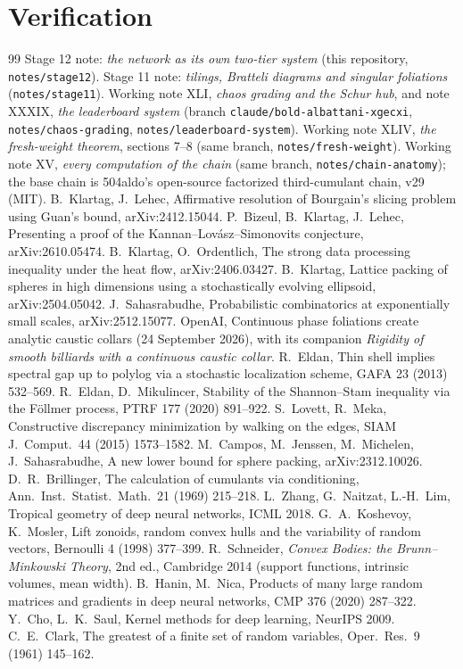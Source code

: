\documentclass[11pt]{article}
\theoremstyle{plain}
\theoremstyle{definition}\newtheorem{definition}[theorem]{Definition}\newtheorem{remark}[theorem]{Remark}
\begin{document}
\section*{Verification}

\begin{thebibliography}{99}\small
{} Stage 12 note: \emph{the network as its own two-tier system} (this repository, \texttt{notes/stage12}).
 Stage 11 note: \emph{tilings, Bratteli diagrams and singular foliations} (\texttt{notes/stage11}).
 Working note XLI, \emph{chaos grading and the Schur hub}, and note XXXIX, \emph{the leaderboard system} (branch \texttt{claude/bold-albattani-xgecxi}, \texttt{notes/chaos-grading}, \texttt{notes/leaderboard-system}).
 Working note XLIV, \emph{the fresh-weight theorem}, sections 7--8 (same branch, \texttt{notes/fresh-weight}).
 Working note XV, \emph{every computation of the chain} (same branch, \texttt{notes/chain-anatomy}); the base chain is 504aldo's open-source factorized third-cumulant chain, v29 (MIT).
 B.~Klartag, J.~Lehec, Affirmative resolution of Bourgain's slicing problem using Guan's bound, arXiv:2412.15044.
 P.~Bizeul, B.~Klartag, J.~Lehec, Presenting a proof of the Kannan--Lov\'asz--Simonovits conjecture, arXiv:2610.05474.
 B.~Klartag, O.~Ordentlich, The strong data processing inequality under the heat flow, arXiv:2406.03427.
 B.~Klartag, Lattice packing of spheres in high dimensions using a stochastically evolving ellipsoid, arXiv:2504.05042.
 J.~Sahasrabudhe, Probabilistic combinatorics at exponentially small scales, arXiv:2512.15077.
 OpenAI, Continuous phase foliations create analytic caustic collars (24 September 2026), with its companion \emph{Rigidity of smooth billiards with a continuous caustic collar}.
 R.~Eldan, Thin shell implies spectral gap up to polylog via a stochastic localization scheme, GAFA 23 (2013) 532--569.
 R.~Eldan, D.~Mikulincer, Stability of the Shannon--Stam inequality via the F\"ollmer process, PTRF 177 (2020) 891--922.
 S.~Lovett, R.~Meka, Constructive discrepancy minimization by walking on the edges, SIAM J.~Comput.~44 (2015) 1573--1582.
 M.~Campos, M.~Jenssen, M.~Michelen, J.~Sahasrabudhe, A new lower bound for sphere packing, arXiv:2312.10026.
 D.~R.~Brillinger, The calculation of cumulants via conditioning, Ann.~Inst.~Statist.~Math.~21 (1969) 215--218.
 L.~Zhang, G.~Naitzat, L.-H.~Lim, Tropical geometry of deep neural networks, ICML 2018.
 G.~A.~Koshevoy, K.~Mosler, Lift zonoids, random convex hulls and the variability of random vectors, Bernoulli 4 (1998) 377--399.
 R.~Schneider, \emph{Convex Bodies: the Brunn--Minkowski Theory}, 2nd ed., Cambridge 2014 (support functions, intrinsic volumes, mean width).
 B.~Hanin, M.~Nica, Products of many large random matrices and gradients in deep neural networks, CMP 376 (2020) 287--322.
 Y.~Cho, L.~K.~Saul, Kernel methods for deep learning, NeurIPS 2009.
 C.~E.~Clark, The greatest of a finite set of random variables, Oper.~Res.~9 (1961) 145--162.
\end{thebibliography}
\end{document}
